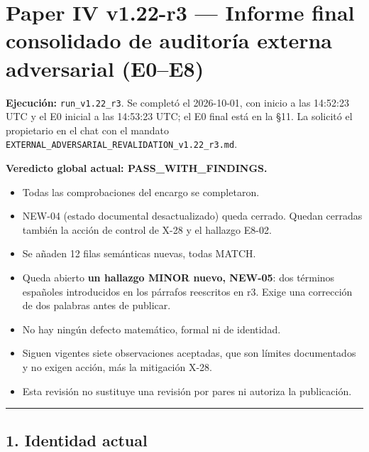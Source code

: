 \documentclass[
]{article}
\author{}
\date{}
\providecommand{\tightlist}{%
  \setlength{\itemsep}{0pt}\setlength{\parskip}{0pt}}
\begin{document}
\section{Paper IV v1.22-r3 --- Informe final consolidado de auditoría
externa adversarial
(E0--E8)}\label{paper-iv-v122-r3--informe-final-consolidado-de-auditoruxeda-externa-adversarial-e0e8}

\textbf{Ejecución:} \texttt{run\_v1.22\_r3}. Se completó el 2026-10-01,
con inicio a las 14:52:23 UTC y el E0 inicial a las 14:53:23 UTC; el E0
final está en la §11. La solicitó el propietario en el chat con el
mandato \texttt{EXTERNAL\_ADVERSARIAL\_REVALIDATION\_v1.22\_r3.md}.

\textbf{Veredicto global actual: PASS\_WITH\_FINDINGS.}

\begin{itemize}
\tightlist
\item
  Todas las comprobaciones del encargo se completaron.
\item
  NEW-04 (estado documental desactualizado) queda cerrado. Quedan
  cerradas también la acción de control de X-28 y el hallazgo E8-02.
\item
  Se añaden 12 filas semánticas nuevas, todas MATCH.
\item
  Queda abierto \textbf{un hallazgo MINOR nuevo, NEW-05}: dos términos
  españoles introducidos en los párrafos reescritos en r3. Exige una
  corrección de dos palabras antes de publicar.
\item
  No hay ningún defecto matemático, formal ni de identidad.
\item
  Siguen vigentes siete observaciones aceptadas, que son límites
  documentados y no exigen acción, más la mitigación X-28.
\item
  Esta revisión no sustituye una revisión por pares ni autoriza la
  publicación.
\end{itemize}

\begin{center}\rule{0.5\linewidth}{0.5pt}\end{center}

\subsection{1. Identidad actual}\label{1-identidad-actual}
\end{document}
